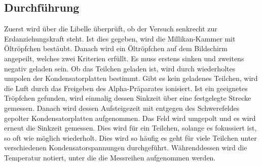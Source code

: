 \subsection{Durchführung}
\label{sec:durchfuehrung}
Zuerst wird über die Libelle überprüft, ob der Versuch senkrecht zur Erdanziehungskraft steht.
Ist dies gegeben, wird die Millikan-Kammer mit Öltröpfchen bestäubt.
Danach wird ein Öltröpfchen auf dem Bildschirm angepeilt, welches zwei Kriterien erfüllt.
Es muss erstens sinken und zweitens negativ geladen sein.
Ob das Teilchen geladen ist, wird durch wiederholtes umpolen der Kondensatorplatten bestimmt.
Gibt es kein geladenes Teilchen, wird die Luft durch das Freigeben des Alpha-Präparates ionisiert.
Ist ein geeignetes Tröpfchen gefunden, wird einmalig dessen Sinkzeit über eine festgelegte Strecke gemessen.
Danach wird dessen Aufsteigezeit mit entgegen des Schwerefeldes gepolter Kondensatorplatten aufgenommen.
Das Feld wird umgepolt und es wird erneut die Sinkzeit gemessen.
Dies wird für ein Teilchen, solange es fokussiert ist, so oft wie möglich wiederholt.
Dies wird so häufig es geht für viele Teilchen unter verschiedenen Kondensatorspannungen durchgeführt.
Währenddessen wird die Temperatur notiert, unter die die Messreihen aufgenommen werden.
